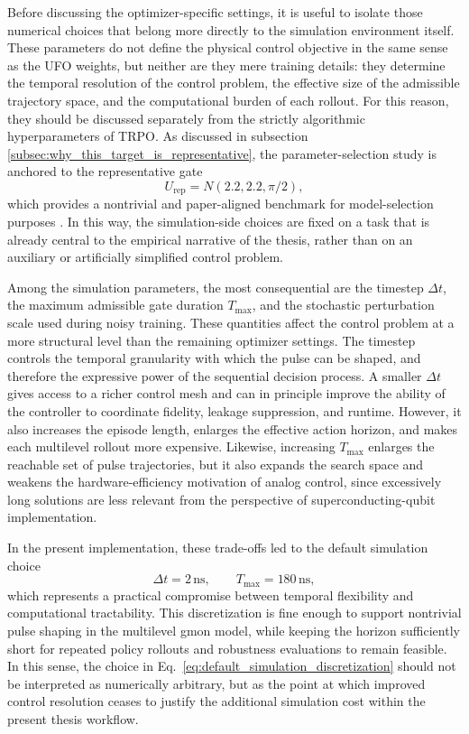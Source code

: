 Before discussing the optimizer-specific settings, it is useful to isolate those numerical choices that belong more directly to the simulation environment itself. These parameters do not define the physical control objective in the same sense as the UFO weights, but neither are they mere training details: they determine the temporal resolution of the control problem, the effective size of the admissible trajectory space, and the computational burden of each rollout. For this reason, they should be discussed separately from the strictly algorithmic hyperparameters of TRPO. As discussed in subsection \ref{subsec:why_this_target_is_representative}, the parameter-selection study is anchored to the representative gate
\begin{equation}
U_{\mathrm{rep}} = N(2.2,2.2,\pi/2),
\label{eq:representative_gate_simulation_study}
\end{equation}
which provides a nontrivial and paper-aligned benchmark for model-selection purposes \cite{Niu2019}. In this way, the simulation-side choices are fixed on a task that is already central to the empirical narrative of the thesis, rather than on an auxiliary or artificially simplified control problem.

Among the simulation parameters, the most consequential are the timestep \(\Delta t\), the maximum admissible gate duration \(T_{\max}\), and the stochastic perturbation scale used during noisy training. These quantities affect the control problem at a more structural level than the remaining optimizer settings. The timestep controls the temporal granularity with which the pulse can be shaped, and therefore the expressive power of the sequential decision process. A smaller \(\Delta t\) gives access to a richer control mesh and can in principle improve the ability of the controller to coordinate fidelity, leakage suppression, and runtime. However, it also increases the episode length, enlarges the effective action horizon, and makes each multilevel rollout more expensive. Likewise, increasing \(T_{\max}\) enlarges the reachable set of pulse trajectories, but it also expands the search space and weakens the hardware-efficiency motivation of analog control, since excessively long solutions are less relevant from the perspective of superconducting-qubit implementation.

In the present implementation, these trade-offs led to the default simulation choice
\begin{equation}
\Delta t = 2\,\mathrm{ns},
\qquad
T_{\max}=180\,\mathrm{ns},
\label{eq:default_simulation_discretization}
\end{equation}
which represents a practical compromise between temporal flexibility and computational tractability. This discretization is fine enough to support nontrivial pulse shaping in the multilevel gmon model, while keeping the horizon sufficiently short for repeated policy rollouts and robustness evaluations to remain feasible. In this sense, the choice in Eq.~\eqref{eq:default_simulation_discretization} should not be interpreted as numerically arbitrary, but as the point at which improved control resolution ceases to justify the additional simulation cost within the present thesis workflow.

